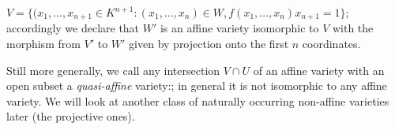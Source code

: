 $V = \{(x_1,\ldots,x_{n+1}\in K^{n+1}: (x_1,\ldots,x_n)\in W, f(x_1,\ldots,x_n) x_{n+1} = 1\}$; accordingly we declare that $W'$ is an affine variety isomorphic to $V$ with the morphism from $V'$ to $W'$ given by projection onto the first $n$ coordinates.  
 
 Still more generally, we call any intersection $V\cap U$ of an affine variety with an open subset a
 {\sl quasi-affine} variety:; in general it is not isomorphic to any affine variety.  We will look at another class of naturally occurring non-affine varieties later (the projective ones).